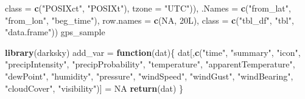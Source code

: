 \documentclass[12pt]{book}
\newenvironment{Shaded}{\begin{snugshade}}{\end{snugshade}}
\newcommand{\ControlFlowTok}[1]{\textcolor[rgb]{0.13,0.29,0.53}{\textbf{#1}}}
\newcommand{\DataTypeTok}[1]{\textcolor[rgb]{0.13,0.29,0.53}{#1}}
\newcommand{\KeywordTok}[1]{\textcolor[rgb]{0.13,0.29,0.53}{\textbf{#1}}}
\newcommand{\NormalTok}[1]{#1}
\newcommand{\OtherTok}[1]{\textcolor[rgb]{0.56,0.35,0.01}{#1}}
\newcommand{\StringTok}[1]{\textcolor[rgb]{0.31,0.60,0.02}{#1}}
\numberwithin{equation}{chapter}
\begin{document}
\begin{Shaded}
\begin{Highlighting}[]
      \DataTypeTok{class =} \KeywordTok{c}\NormalTok{(}\StringTok{"POSIXct"}\NormalTok{, }\StringTok{"POSIXt"}\NormalTok{), }\DataTypeTok{tzone =} \StringTok{"UTC"}\NormalTok{)), }
    \DataTypeTok{.Names =} \KeywordTok{c}\NormalTok{(}\StringTok{"from_lat"}\NormalTok{, }\StringTok{"from_lon"}\NormalTok{, }\StringTok{"beg_time"}\NormalTok{), }
    \DataTypeTok{row.names =} \KeywordTok{c}\NormalTok{(}\OtherTok{NA}\NormalTok{, 20L), }
    \DataTypeTok{class =} \KeywordTok{c}\NormalTok{(}\StringTok{"tbl_df"}\NormalTok{, }\StringTok{"tbl"}\NormalTok{, }\StringTok{"data.frame"}\NormalTok{))}
\NormalTok{gps_sample}
\end{Highlighting}
\end{Shaded}

\begin{Shaded}
\begin{Highlighting}[]
\KeywordTok{library}\NormalTok{(darksky)}
\NormalTok{add_var =}\StringTok{ }\ControlFlowTok{function}\NormalTok{(dat)\{}
\NormalTok{  dat[,}\KeywordTok{c}\NormalTok{(}\StringTok{"time"}\NormalTok{, }\StringTok{"summary"}\NormalTok{, }\StringTok{"icon"}\NormalTok{, }\StringTok{"precipIntensity"}\NormalTok{, }
         \StringTok{"precipProbability"}\NormalTok{, }\StringTok{"temperature"}\NormalTok{, }\StringTok{"apparentTemperature"}\NormalTok{, }
         \StringTok{"dewPoint"}\NormalTok{, }\StringTok{"humidity"}\NormalTok{, }\StringTok{"pressure"}\NormalTok{, }\StringTok{"windSpeed"}\NormalTok{, }\StringTok{"windGust"}\NormalTok{, }
         \StringTok{"windBearing"}\NormalTok{, }\StringTok{"cloudCover"}\NormalTok{, }\StringTok{"visibility"}\NormalTok{)] =}\StringTok{ }\OtherTok{NA}
  \KeywordTok{return}\NormalTok{(dat)}
\NormalTok{\}}


\end{Highlighting}
\end{Shaded}
\end{document}
